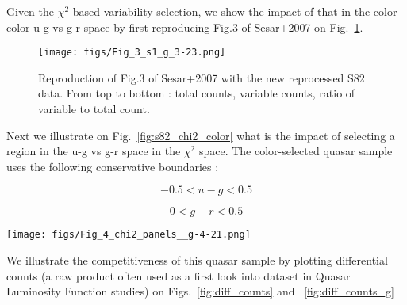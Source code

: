\documentclass[fleqn,usenatbib]{mnras}  %
\begin{document}
Given  the $\chi^{2}$-based variability selection, we show the impact of that in the color-color  u-g vs g-r space by first reproducing Fig.3 of Sesar+2007 on Fig.~\ref{fig:s82_color}.

\begin{figure}
 \texttt{[image: figs/Fig\_3\_s1\_g\_3-23.png]}
 \caption{Reproduction of Fig.3 of Sesar+2007 with the new reprocessed S82 data. From top to bottom : total counts, variable counts, ratio of variable to total count. }
 \label{fig:s82_color}
\end{figure}

Next we illustrate on Fig.~\ref{fig:s82_chi2_color} what is the impact of  selecting a region in the u-g vs g-r space in the $\chi^{2}$ space. The color-selected quasar sample uses the following conservative boundaries : 

\begin{equation}
-0.5 <u-g < 0.5
\end{equation}


\begin{equation}
0 < g-r< 0.5
\end{equation}

\begin{figure*}
 \texttt{[image: figs/Fig\_4\_chi2\_panels\_\_g-4-21.png]}
 \caption{An impact of color selection in variability space. Left panel contains all objects with 4<g<21, and extendedness=0 . The middle panel depicts the count of those objects that fulfill color criteria  $-0.5 <u-g < 0.5$ and $0 < g-r< 0.5$ . The right panel shows counts of  the ratio of number of color-selected objects to total number, i.e. ratio of middle to left panels. }
 \label{fig:s82_chi2_color}
\end{figure*}


We illustrate the competitiveness of this quasar sample by plotting differential counts (a raw product often used as a first look into dataset in Quasar Luminosity Function studies) on Figs.~\ref{fig:diff_counts} and ~\ref{fig:diff_counts_g}
\end{document}
